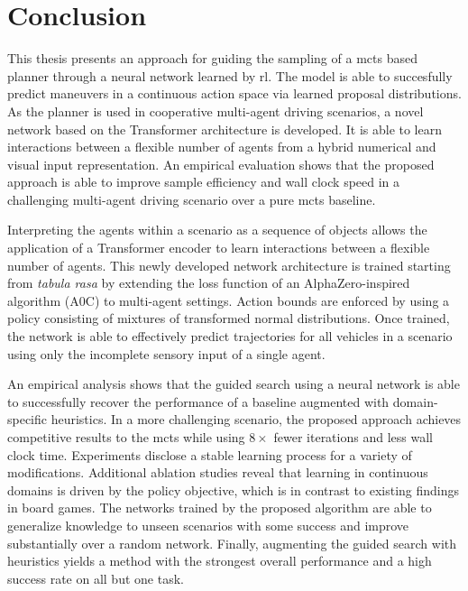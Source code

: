 \glsresetall
\section{Conclusion}\label{sec:conclusion}
This thesis presents an approach for guiding the sampling of a \gls{mcts} based planner through a neural network learned by \gls{rl}. The model is able to succesfully predict maneuvers in a continuous action space via learned proposal distributions. As the planner is used in cooperative multi-agent driving scenarios, a novel network based on the Transformer architecture is developed. It is able to learn interactions between a flexible number of agents from a hybrid numerical and visual input representation. An empirical evaluation shows that the proposed approach is able to improve sample efficiency and wall clock speed in a challenging multi-agent driving scenario over a pure \gls{mcts} baseline.

Interpreting the agents within a scenario as a sequence of objects allows the application of a Transformer encoder to learn interactions between a flexible number of agents. This newly developed network architecture is trained starting from \emph{tabula rasa} by extending the loss function of an AlphaZero-inspired algorithm (A0C) to multi-agent settings. Action bounds are enforced by using a policy consisting of mixtures of transformed normal distributions. Once trained, the network is able to effectively predict trajectories for all vehicles in a scenario using only the incomplete sensory input of a single agent.

An empirical analysis shows that the guided search using a neural network is able to successfully recover the performance of a baseline augmented with domain-specific heuristics. In a more challenging scenario, the proposed approach achieves competitive results to the \gls{mcts} while using $8 \times$ fewer iterations and less wall clock time. Experiments disclose a stable learning process for a variety of modifications. Additional ablation studies reveal that learning in continuous domains is driven by the policy objective, which is in contrast to existing findings in board games. The networks trained by the proposed algorithm are able to generalize knowledge to unseen scenarios with some success and improve substantially over a random network. Finally, augmenting the guided search with heuristics yields a method with the strongest overall performance and a high success rate on all but one task.